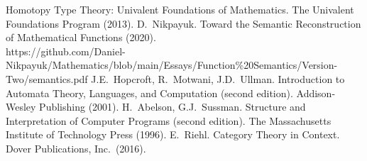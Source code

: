 \documentclass[twoside]{article}
\begin{document}
\newpage

\begin{thebibliography}{99}
 Homotopy Type Theory: Univalent Foundations of Mathematics. The Univalent Foundations Program (2013). 
 D.~Nikpayuk. Toward the Semantic Reconstruction of Mathematical Functions (2020).\\
    https://github.com/Daniel-Nikpayuk/Mathematics/blob/main/Essays/Function\%20Semantics/Version-Two/semantics.pdf
 J.E.~Hopcroft, R.~Motwani, J.D.~Ullman. Introduction to Automata Theory, Languages, and Computation
               (second edition). Addison-Wesley Publishing (2001).
 H.~Abelson, G.J.~Sussman. Structure and Interpretation of Computer Programs (second edition).
               The Massachusetts Institute of Technology Press (1996).
 E.~Riehl. Category Theory in Context. Dover Publications, Inc.~(2016).
\end{thebibliography}
\end{document}
